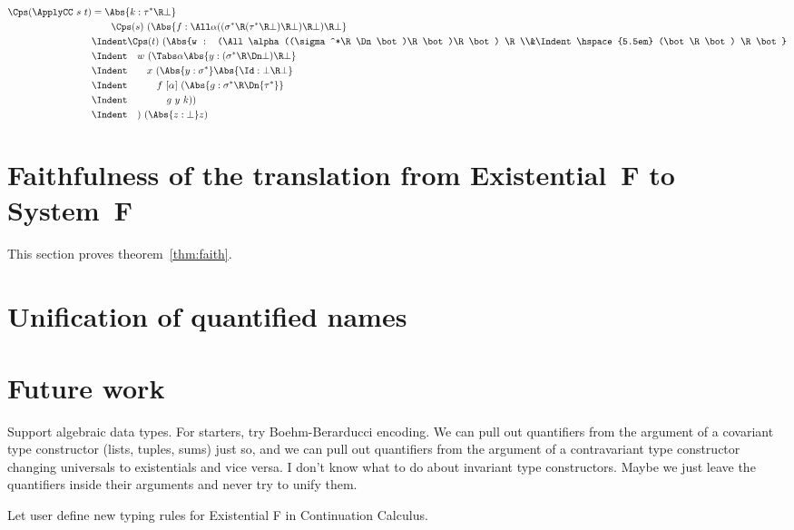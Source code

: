 \documentclass{amsart}
\begin{document}
\begin{align*}
\Cps(\ApplyCC~s~t)
& =
\Abs{k : \tau^* \R \bot}
\\&\hspace{2em}
\Cps(s)~(\Abs{f : \All\alpha
  ((\sigma^*\R(\tau^*\R\bot)\R\bot)\R\bot)\R\bot}
\\&\Indent
\Cps(t)~(\Abs{w :
  (\All\alpha((\sigma^*\R \Dn\bot)\R\bot)\R\bot) \R
  \\&\Indent\hspace{5.5em}
  (\bot\R\bot) \R \bot}
\\&\Indent\hspace{1em}
w~(\Tabs\alpha \Abs{y :
  (\sigma^* \R \Dn\bot) \R \bot}
\\&\Indent\hspace{2em}
x~(\Abs{y : \sigma^*} \Abs{\Id : \bot \R \bot}
\\&\Indent\hspace{3em}
f~[\alpha]~(\Abs{g : \sigma^* \R \Dn{\tau^*}}
\\&\Indent\hspace{4em}
g~y~k))
\\&\Indent\hspace{1em}
)~(\Abs{z:\bot}z)
\end{align*}

\section{Faithfulness of the translation from Existential~F to
System~F}
\label{sec:faith}

This section proves theorem~\ref{thm:faith}.


\section{Unification of quantified names}
\label{sec:unify}

\section{Future work}

Support algebraic data types.
%
For starters, try Boehm-Berarducci encoding.
%
We can pull out quantifiers from the argument of a covariant type
constructor (lists, tuples, sums) just so, and we can pull out
quantifiers from the argument of a contravariant type constructor
changing universals to existentials and vice versa. I don't know
what to do about invariant type constructors. Maybe we just leave
the quantifiers inside their arguments and never try to unify
them.

Let user define new typing rules for Existential F in
Continuation Calculus.
\end{document}
